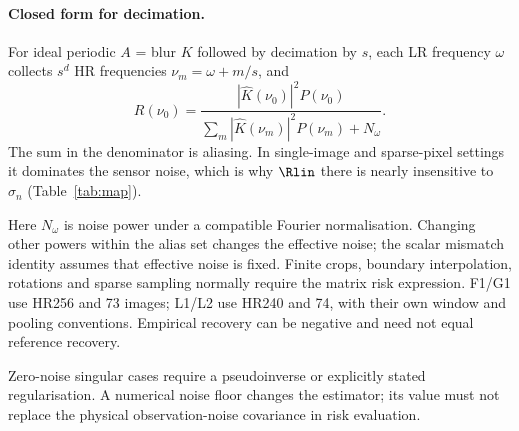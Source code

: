 \paragraph{Closed form for decimation.} For ideal periodic $A$ = blur $K$ followed by
decimation by $s$, each LR frequency $\omega$ collects $s^d$ HR frequencies
$\nu_m=\omega+m/s$, and
\begin{equation}\label{eq:alias}
R(\nu_0)=\frac{|\hat K(\nu_0)|^2P(\nu_0)}{\sum_m|\hat K(\nu_m)|^2P(\nu_m)+N_\omega}.
\end{equation}
The sum in the denominator is aliasing. In single-image and sparse-pixel
settings it dominates the sensor noise, which is why $\Rlin$ there is nearly
insensitive to $\sigma_n$ (Table~\ref{tab:map}).

Here $N_\omega$ is noise power under a compatible Fourier normalisation.
Changing other powers within the alias set changes the effective noise;
the scalar mismatch identity assumes that effective noise is fixed.
Finite crops, boundary interpolation, rotations and sparse sampling
normally require the matrix risk expression. F1/G1 use HR256 and 73 images;
L1/L2 use HR240 and 74, with their own window and pooling conventions.
Empirical recovery can be negative and need not equal reference recovery.

Zero-noise singular cases require a pseudoinverse or explicitly stated
regularisation. A numerical noise floor changes the estimator; its value
must not replace the physical observation-noise covariance in risk evaluation.
